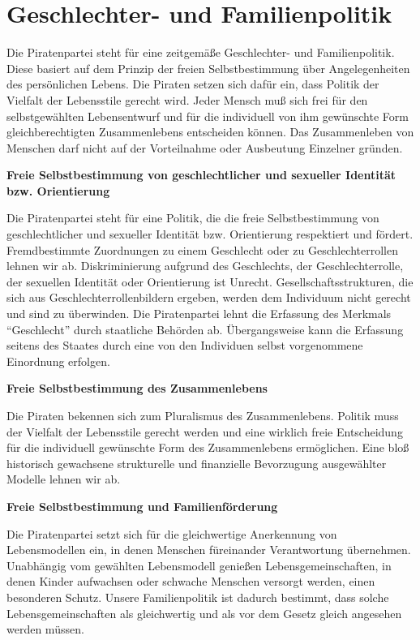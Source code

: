 \section{Geschlechter- und Familienpolitik}

Die Piratenpartei steht für eine zeitgemäße Geschlechter- und Familienpolitik.
Diese basiert auf dem Prinzip der freien Selbstbestimmung über Angelegenheiten
des persönlichen Lebens. Die Piraten setzen sich dafür ein, dass Politik der
Vielfalt der Lebensstile gerecht wird. Jeder Mensch muß sich frei für den
selbstgewählten Lebensentwurf und für die individuell von ihm gewünschte Form
gleichberechtigten Zusammenlebens entscheiden können. Das Zusammenleben von
Menschen darf nicht auf der Vorteilnahme oder Ausbeutung Einzelner gründen.

\textbf{Freie Selbstbestimmung von geschlechtlicher und sexueller Identität bzw.
Orientierung}

Die Piratenpartei steht für eine Politik, die die freie Selbstbestimmung von
geschlechtlicher und sexueller Identität bzw. Orientierung respektiert und
fördert. Fremdbestimmte Zuordnungen zu einem Geschlecht oder zu
Geschlechterrollen lehnen wir ab. Diskriminierung aufgrund des Geschlechts, der
Geschlechterrolle, der sexuellen Identität oder Orientierung ist Unrecht.
Gesellschaftsstrukturen, die sich aus Geschlechterrollenbildern ergeben, werden
dem Individuum nicht gerecht und sind zu überwinden.
Die Piratenpartei lehnt die Erfassung des Merkmals “Geschlecht” durch staatliche
Behörden ab. Übergangsweise kann die Erfassung seitens des Staates durch eine
von den Individuen selbst vorgenommene Einordnung erfolgen.

\textbf{Freie Selbstbestimmung des Zusammenlebens}

Die Piraten bekennen sich zum Pluralismus des Zusammenlebens. Politik muss der
Vielfalt der Lebensstile gerecht werden und eine wirklich freie Entscheidung für
die individuell gewünschte Form des Zusammenlebens ermöglichen. Eine bloß
historisch gewachsene strukturelle und finanzielle Bevorzugung ausgewählter
Modelle lehnen wir ab.

\textbf{Freie Selbstbestimmung und Familienförderung}

Die Piratenpartei setzt sich für die gleichwertige Anerkennung von
Lebensmodellen ein, in denen Menschen füreinander Verantwortung übernehmen.
Unabhängig vom gewählten Lebensmodell genießen Lebensgemeinschaften, in denen
Kinder aufwachsen oder schwache Menschen versorgt werden, einen besonderen
Schutz. Unsere Familienpolitik ist dadurch bestimmt, dass solche
Lebensgemeinschaften als gleichwertig und als vor dem Gesetz gleich angesehen
werden müssen.
 

